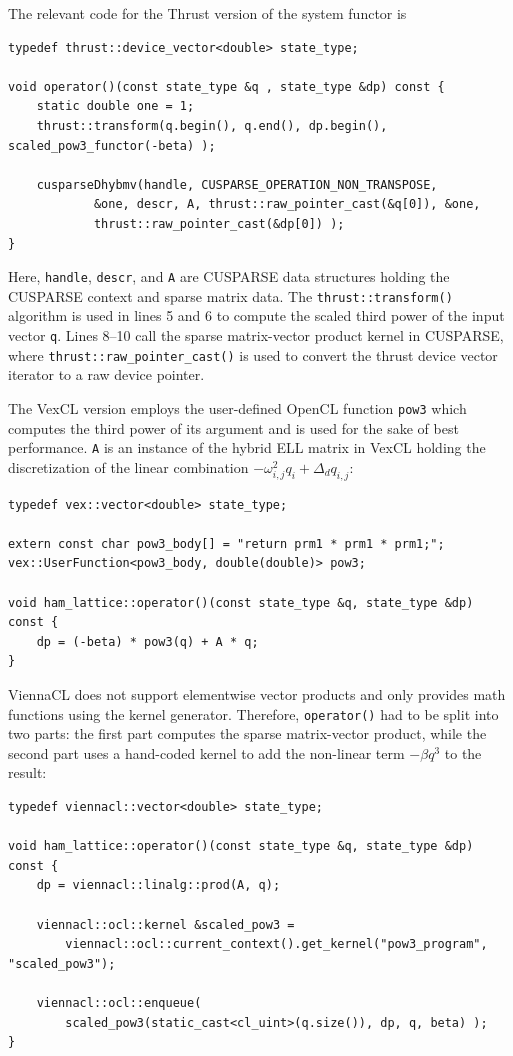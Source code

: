 \documentclass[final]{siamltex}
\newcommand{\code}[1]{\lstinline|#1|}
\begin{document}
The relevant code for the Thrust version of the system functor is
\begin{lstlisting}
typedef thrust::device_vector<double> state_type;

void operator()(const state_type &q , state_type &dp) const {
    static double one = 1;
    thrust::transform(q.begin(), q.end(), dp.begin(), scaled_pow3_functor(-beta) );

    cusparseDhybmv(handle, CUSPARSE_OPERATION_NON_TRANSPOSE,
            &one, descr, A, thrust::raw_pointer_cast(&q[0]), &one,
            thrust::raw_pointer_cast(&dp[0]) );
}
\end{lstlisting}
Here, \code{handle}, \code{descr}, and \code{A} are CUSPARSE data structures
holding the CUSPARSE context and sparse matrix data. The
\code{thrust::transform()} algorithm is used in lines 5 and 6 to compute the scaled
third power of the input vector \code{q}. Lines 8--10 call the sparse matrix-vector product kernel in CUSPARSE,
where \code{thrust::raw_pointer_cast()} is used to convert the thrust device
vector iterator to a raw device pointer.

The VexCL version employs the user-defined OpenCL function \code{pow3} which
computes the third power of its argument and is used for the sake of best performance.
\code{A} is an instance of the hybrid ELL matrix in VexCL
holding the discretization of the linear combination $- \omega_{i,j}^2 q_i + \Delta_d q_{i,j}$:
\begin{lstlisting}
typedef vex::vector<double> state_type;

extern const char pow3_body[] = "return prm1 * prm1 * prm1;";
vex::UserFunction<pow3_body, double(double)> pow3;

void ham_lattice::operator()(const state_type &q, state_type &dp) const {
    dp = (-beta) * pow3(q) + A * q;
}
\end{lstlisting}

ViennaCL does not support elementwise vector products and only provides
math functions using the kernel generator. Therefore,
\code{operator()} had to be split into two parts: the first part computes
the sparse matrix-vector product, while the second part uses a hand-coded kernel to
add the non-linear term $-\beta q^3$ to the result:
\begin{lstlisting}
typedef viennacl::vector<double> state_type;

void ham_lattice::operator()(const state_type &q, state_type &dp) const {
    dp = viennacl::linalg::prod(A, q);

    viennacl::ocl::kernel &scaled_pow3 =
        viennacl::ocl::current_context().get_kernel("pow3_program", "scaled_pow3");

    viennacl::ocl::enqueue(
        scaled_pow3(static_cast<cl_uint>(q.size()), dp, q, beta) );
}
\end{lstlisting}
\end{document}
